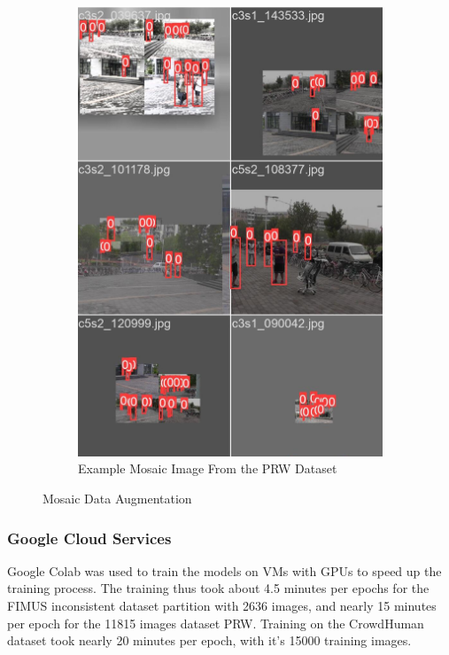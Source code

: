 \begin{figure}[H]
\begin{subfigure}{0.49\textwidth}
        \includegraphics[width=\textwidth]{Images/mosaic_prw.jpg}
        \caption{\centering Example Mosaic Image From the PRW Dataset}
    \end{subfigure}
    \caption{\centering Mosaic Data Augmentation}
    \label{fig:mosiac}
\end{figure}

\subsubsection{Google Cloud Services}
Google Colab was used to train the models on VMs with GPUs to speed up the training process. The training thus took about 4.5 minutes per epochs for the FIMUS inconsistent dataset partition with 2636 images, and nearly 15 minutes per epoch for the 11815 images dataset PRW. Training on the CrowdHuman dataset took nearly 20 minutes per epoch, with it's 15000 training images. 


